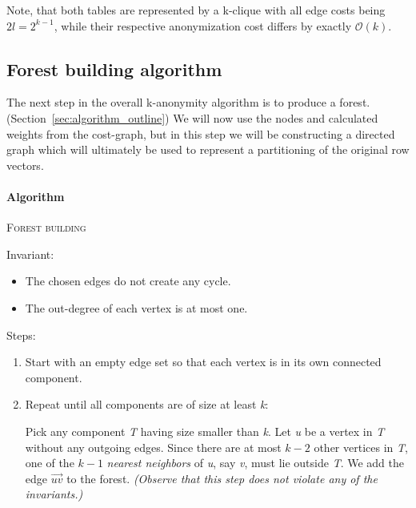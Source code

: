 Note, that both tables are represented by a k-clique with all edge costs being \(2l=2^{k-1}\), while their respective anonymization cost differs by exactly \(\mathcal{O}(k)\).

\vspace{\baselineskip}


\subsection{Forest building algorithm}\label{subsec:forest-building-algorithm}

The next step in the overall k-anonymity algorithm is to produce a forest. (Section~\ref{sec:algorithm_outline}) We will now use the nodes and calculated weights from the cost-graph, but in this step we will be constructing a directed graph which will ultimately be used to represent a partitioning of the original row vectors.

\paragraph{Algorithm} \textsc{Forest building}~\cite{aggarwal}

Invariant:
\begin{itemize}
    \item The chosen edges do not create any cycle.
    \item The out-degree of each vertex is at most one.
\end{itemize}

Steps:
\begin{enumerate}
    \item Start with an empty edge set so that each vertex is in its own connected component.
    \item Repeat until all components are of size at least \textit{k}: \par
    Pick any component \textit{T} having size smaller than \textit{k}.
    Let \textit{u} be a vertex in \textit{T} without any outgoing edges.
    Since there are at most \(k-2\) other vertices in \textit{T}, one of the \(k-1\) \emph{nearest neighbors} of \textit{u}, say \textit{v}, must lie outside \textit{T}.
    We add the edge \(\vec{uv}\) to the forest. \textit{(Observe that this step does not violate any of the invariants.)}
\end{enumerate}

\vspace{\baselineskip}

